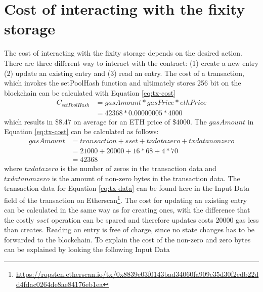 \section{Cost of interacting with the fixity storage}\label{sec:cost-interating}
The cost of interacting with the fixity storage depends on the desired action. There are three different way to interact with the contract: (1) create a new entry (2) update an existing entry and (3) read an entry.
The cost of a transaction, which invokes the setPoolHash function and ultimately stores 256 bit on the blockchain can be calculated with Equation \ref{eq:tx-cost}
\begin{equation}\label{eq:tx-cost}
    \begin{split}
        C_{setPoolHash} & = gasAmount * gasPrice * ethPrice \\ 
        & = 42368 * 0.00000005 * 4000
    \end{split}
\end{equation}
which results in \$8.47 on average for an ETH price of \$4000.
The $gasAmount$ in Equation \ref{eq:tx-cost} can be calculated as follows:
\begin{equation}\label{eq:tx-data}
  \begin{split}
    gasAmount & = transaction + sset + txdatazero + txdatanonzero \\
     & = 21000 + 20000 + 16 * 68 + 4 * 70  \\
     & = 42368
  \end{split}
\end{equation}
where $txdatazero$ is the number of zeros in the transaction data and $txdatanonzero$ is the amount of non-zero bytes in the transaction data. The transaction data for Equation \ref{eq:tx-data} can be found here in the Input Data field of the transaction on Etherscan\footnote{\url{https://ropsten.etherscan.io/tx/0x8839e03f0143bad34060fa909c35d30f2edb22dd4fdac0264de8ae84176eb1ea}}.
The cost for updating an existing entry can be calculated in the same way as for creating ones, with the difference that the costly $sset$ operation can be spared and therefore updates costs 20000 gas less than creates.
Reading an entry is free of charge, since no state changes has to be forwarded to the blockchain.
To explain the cost of the non-zero and zero bytes can be explained by looking the following Input Data


